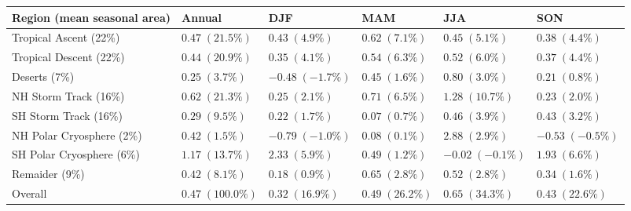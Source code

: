 \begin{tabular}{llllll}
\hline
Region (mean seasonal area) & Annual & DJF & MAM & JJA & SON \\
\hline
Tropical Ascent (22\%) & $\mathbf{0.47}\;(21.5\%)$ & $0.43\;(4.9\%)$ & $0.62\;(7.1\%)$ & $\mathbf{0.45}\;(5.1\%)$ & $0.38\;(4.4\%)$ \\
Tropical Descent (22\%) & $\mathbf{0.44}\;(20.9\%)$ & $0.35\;(4.1\%)$ & $0.54\;(6.3\%)$ & $0.52\;(6.0\%)$ & $0.37\;(4.4\%)$ \\
Deserts (7\%) & $0.25\;(3.7\%)$ & $-0.48\;(-1.7\%)$ & $0.45\;(1.6\%)$ & $\mathbf{0.80}\;(3.0\%)$ & $0.21\;(0.8\%)$ \\
NH Storm Track (16\%) & $\mathbf{0.62}\;(21.3\%)$ & $0.25\;(2.1\%)$ & $\mathbf{0.71}\;(6.5\%)$ & $\mathbf{1.28}\;(10.7\%)$ & $0.23\;(2.0\%)$ \\
SH Storm Track (16\%) & $0.29\;(9.5\%)$ & $0.22\;(1.7\%)$ & $0.07\;(0.7\%)$ & $\mathbf{0.46}\;(3.9\%)$ & $0.43\;(3.2\%)$ \\
NH Polar Cryosphere (2\%) & $0.42\;(1.5\%)$ & $-0.79\;(-1.0\%)$ & $0.08\;(0.1\%)$ & $\mathbf{2.88}\;(2.9\%)$ & $-0.53\;(-0.5\%)$ \\
SH Polar Cryosphere (6\%) & $\mathbf{1.17}\;(13.7\%)$ & $\mathbf{2.33}\;(5.9\%)$ & $0.49\;(1.2\%)$ & $-0.02\;(-0.1\%)$ & $\mathbf{1.93}\;(6.6\%)$ \\
Remaider (9\%) & $\mathbf{0.42}\;(8.1\%)$ & $0.18\;(0.9\%)$ & $\mathbf{0.65}\;(2.8\%)$ & $\mathbf{0.52}\;(2.8\%)$ & $0.34\;(1.6\%)$ \\
Overall & $\mathbf{0.47}\;(100.0\%)$ & $\mathbf{0.32}\;(16.9\%)$ & $\mathbf{0.49}\;(26.2\%)$ & $\mathbf{0.65}\;(34.3\%)$ & $\mathbf{0.43}\;(22.6\%)$ \\
\hline
\end{tabular}
